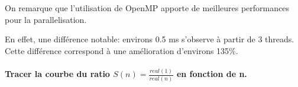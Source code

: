 \documentclass[letterpaper,12pt]{article}
\newcommand{\question}[1]{\paragraph{#1\\ \vspace{0.5cm}}}
\begin{document}
On remarque que l'utilisation de OpenMP apporte de meilleures performances pour la parallelisation.

En effet, une différence notable: environs 0.5 ms s'observe à partir de 3 threads. Cette différence correspond à une amélioration d'environs 135\%.


\question{Tracer la courbe du ratio $S(n) = \frac{real(1)}{real(n)}$ en fonction de n.}
\end{document}
